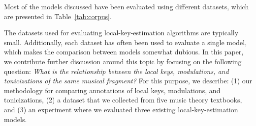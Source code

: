 Most of the models discussed have been evaluated using
different datasets, which are presented in
Table~\ref{tab:corpus}.


The datasets used for evaluating local-key-estimation
algorithms are typically small. Additionally, each dataset
has often been used to evaluate a single model, which makes
the comparison between models somewhat dubious. In this
paper, we contribute further discussion around this topic by
focusing on the following question: \emph{What is the
relationship between the local keys, modulations, and
tonicizations of the same musical fragment?} For this
purpose, we describe: (1) our methodology for comparing
annotations of local keys, modulations, and tonicizations,
(2) a dataset that we collected from five music theory
textbooks, and (3) an experiment where we evaluated three
existing local-key-estimation models.
